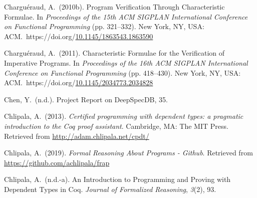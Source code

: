 \documentclass[12pt,twoside]{article}
\begin{document}
{\begin{thebibliography}{222}
\mdbibitemlabel{}Charguéraud, A.~(2010b). Program Verification Through Characteristic Formulae. In \emph{Proceedings of the 15th ACM SIGPLAN International Conference on Functional Programming} (pp. 321–332). New York, NY, USA: ACM.~https://doi.org/\href{https://dx.doi.org/10.1145/1863543.1863590}{10.1145/1863543.1863590}\label{chargueraud_program_2010}%

\mdbibitemlabel{}Charguéraud, A.~(2011). Characteristic Formulae for the Verification of Imperative Programs. In \emph{Proceedings of the 16th ACM SIGPLAN International Conference on Functional Programming} (pp. 418–430). New York, NY, USA: ACM.~https://doi.org/\href{https://dx.doi.org/10.1145/2034773.2034828}{10.1145/2034773.2034828}\label{chargueraud_characteristic_2011}%

\mdbibitemlabel{}Chen, Y.~(n.d.). Project Report on DeepSpecDB, 35.\label{chen_project_nodate}%

\mdbibitemlabel{}Chlipala, A.~(2013). \emph{Certified programming with dependent types: a pragmatic introduction to the Coq proof assistant}. Cambridge, MA: The MIT Press. Retrieved from \href{http://adam.chlipala.net/cpdt/}{{\ttfamily http://\hspace{0pt}adam.\hspace{0pt}chlipala.\hspace{0pt}net/\hspace{0pt}cpdt/\hspace{0pt}}}\label{chlipala_certified_2013}%

\mdbibitemlabel{}Chlipala, A.~(2019). \emph{Formal Reasoning About Programs - Github}. Retrieved from \href{https://github.com/achlipala/frap}{{\ttfamily https://\hspace{0pt}github.\hspace{0pt}com/\hspace{0pt}achlipala/\hspace{0pt}frap}}\label{chlipala_formal_2019}%

\mdbibitemlabel{}Chlipala, A.~(n.d.-a). An Introduction to Programming and Proving with Dependent Types in Coq. \emph{Journal of Formalized Reasoning}, \emph{3}(2), 93.\label{chlipala_introduction_nodate}%


\end{thebibliography}}
\end{document}
